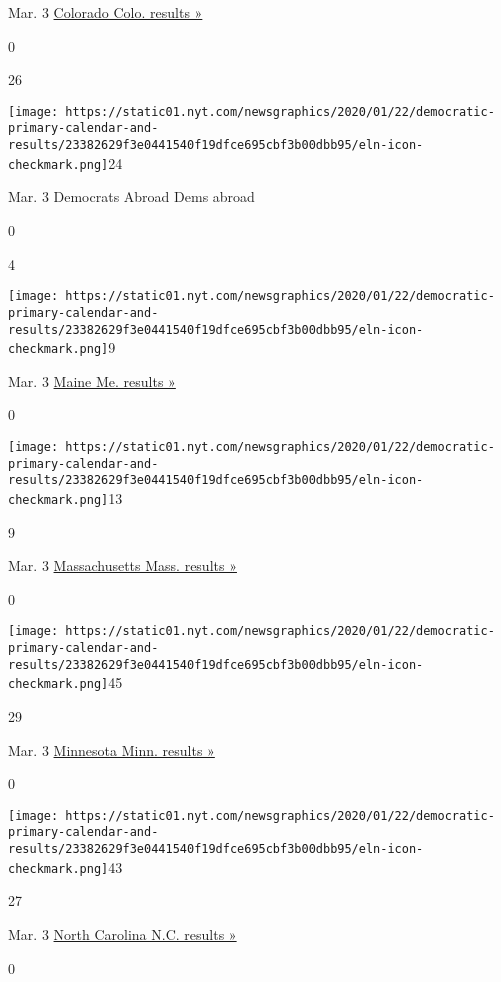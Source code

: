 Mar. 3
\href{https://www.nytimes.com/interactive/2020/03/03/us/elections/results-colorado-president-democrat-primary-election.html}{Colorado
Colo. results »}

0

26

\texttt{[image: https://static01.nyt.com/newsgraphics/2020/01/22/democratic-primary-calendar-and-results/23382629f3e0441540f19dfce695cbf3b00dbb95/eln-icon-checkmark.png]}24

Mar. 3 Democrats Abroad Dems abroad

0

4

\texttt{[image: https://static01.nyt.com/newsgraphics/2020/01/22/democratic-primary-calendar-and-results/23382629f3e0441540f19dfce695cbf3b00dbb95/eln-icon-checkmark.png]}9

Mar. 3
\href{https://www.nytimes.com/interactive/2020/03/03/us/elections/results-maine-president-democrat-primary-election.html}{Maine
Me. results »}

0

\texttt{[image: https://static01.nyt.com/newsgraphics/2020/01/22/democratic-primary-calendar-and-results/23382629f3e0441540f19dfce695cbf3b00dbb95/eln-icon-checkmark.png]}13

9

Mar. 3
\href{https://www.nytimes.com/interactive/2020/03/03/us/elections/results-massachusetts-president-democrat-primary-election.html}{Massachusetts
Mass. results »}

0

\texttt{[image: https://static01.nyt.com/newsgraphics/2020/01/22/democratic-primary-calendar-and-results/23382629f3e0441540f19dfce695cbf3b00dbb95/eln-icon-checkmark.png]}45

29

Mar. 3
\href{https://www.nytimes.com/interactive/2020/03/03/us/elections/results-minnesota-president-democrat-primary-election.html}{Minnesota
Minn. results »}

0

\texttt{[image: https://static01.nyt.com/newsgraphics/2020/01/22/democratic-primary-calendar-and-results/23382629f3e0441540f19dfce695cbf3b00dbb95/eln-icon-checkmark.png]}43

27

Mar. 3
\href{https://www.nytimes.com/interactive/2020/03/03/us/elections/results-north-carolina-president-democrat-primary-election.html}{North
Carolina N.C. results »}

0

